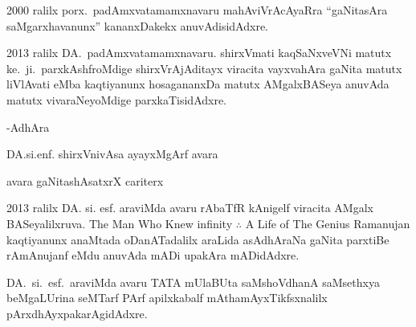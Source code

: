{\rm 2000} ralilx porx.~padAmxvatamamxnavaru mahAviVrAcAyaRra ``gaNitasAra saMgarxhavanunx'' kananxDakekx anuvAdisidAdxre.

{\rm 2013} ralilx DA.~padAmxvatamamxnavaru. shirxVmati kaqSaNxveVNi matutx ke.~ji.~parxkAshf\-roMdige shirxVrAjAditayx viracita vayxvahAra gaNita matutx liVlAvati eMba kaqtiyanunx hosagananxDa matutx AMgalxBASeya anuvAda matutx vivaraNeyoMdige parxkaTisidAdxre.

\medskip
\hfill{-AdhAra}\hspace{1.8cm}

\hfill{DA.si.enf. shirxVnivAsa ayayxMgArf avara}

\hfill{avara gaNitashAsatxrX cariterx}\hspace{1cm}

{\rm 2013} ralilx DA. si. esf. araviMda avaru rAbaTfR kAnigelf viracita AMgalx BASeyalilxruva.
{\rm The Man Who Knew infinity $\therefore$ A Life of The Genius Ramanujan} kaqtiyanunx anaMtada oDanATadalilx araLida asAdhAraNa gaNita parxtiBe rAmAnujanf eMdu anuvAda mADi upakAra mADidAdxre.

DA.~si.~esf.~araviMda avaru TATA mUlaBUta saMshoVdhanA saMsethxya beMgaLUrina seMTarf PArf apilxkabalf mAthamAyxTikfsxnalilx pArxdhAyxpakarAgidAdxre.


